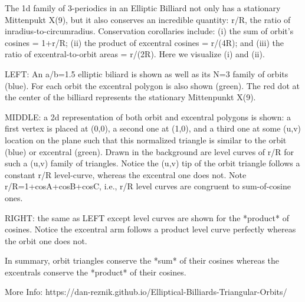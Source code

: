 The 1d family of 3-periodics in an Elliptic Billiard not only has a stationary Mittenpukt X(9), but it also conserves an incredible quantity: r/R, the ratio of inradius-to-circumradius. Conservation corollaries include: (i) the sum of orbit's cosines = 1+r/R; (ii) the product of excentral cosines = r/(4R); and (iii) the ratio of excentral-to-orbit areas = r/(2R). Here we visualize (i) and (ii).

LEFT: An a/b=1.5 elliptic biliard is shown as well as its N=3 family of orbits (blue). For each orbit the excentral polygon is also shown (green). The red dot at the center of the billiard represents the stationary Mittenpunkt X(9). 

MIDDLE: a 2d representation of both orbit and excentral polygons is shown: a first vertex is placed at (0,0), a second one at (1,0), and a third one at some (u,v) location on the plane such that this normalized triangle is similar to the orbit (blue) or excentral (green). Drawn in the background are level curves of r/R for such a (u,v) family of triangles. Notice the (u,v) tip of the orbit triangle follows a constant r/R level-curve, whereas the excentral one does not. Note r/R=1+cosA+cosB+cosC, i.e., r/R level curves are congruent to sum-of-cosine ones.

RIGHT: the same as LEFT except level curves are shown for the *product* of cosines. Notice the excentral arm follows a product level curve perfectly whereas the orbit one does not.

In summary, orbit triangles conserve the *sum* of their cosines whereas the excentrals conserve the *product* of their cosines.

More Info:  https://dan-reznik.github.io/Elliptical-Billiards-Triangular-Orbits/